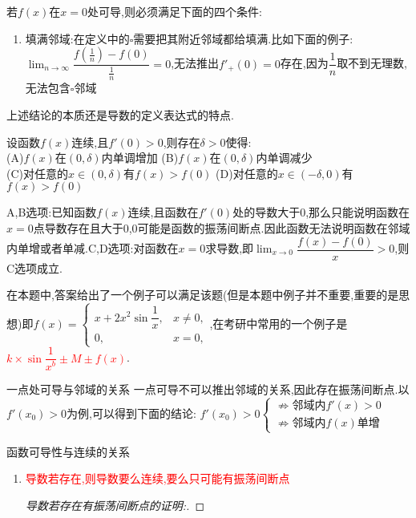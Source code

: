 \documentclass[8pt a4paper, oneside, UTF8]{ctexbook}  %
\begin{document}
\begin{sloppypar}
\begin{conclusion}{若$f(x)$在$x=0$处可导,则必须满足下面的四个条件:}{}
\begin{enumerate}
            \item 填满邻域:在定义中的$\square$需要把其附近邻域都给填满.比如下面的例子:$\lim_{n\to \infty}\dfrac{f(\frac{1}{n})-f(0)}{\frac{1}{n}}=0$,无法推出$f'_+(0)=0$存在,因为$\dfrac{1}{n}$取不到无理数,无法包含$\square$邻域
        \end{enumerate}
        上述结论的本质还是导数的定义表达式的特点.
    \end{conclusion}
    \begin{problem}
    设函数$f(x)$连续,且$f'(0)>0$,则存在$\delta >0 $使得:\\
    (A)$f(x)$在$(0,\delta)$内单调增加 \quad (B)$f(x)$在$(0,\delta)$内单调减少\\
    (C)对任意的$x \in (0,\delta)$有$f(x)>f(0)$ \quad    (D)对任意的$x\in (-\delta,0)$有$f(x)>f(0)$
    \end{problem}
    \begin{solution}
        A,B选项:已知函数$f(x)$连续,且函数在$f'(0)$处的导数大于0,那么只能说明函数在$x=0$点导数存在且大于0,0可能是函数的振荡间断点.因此函数无法说明函数在邻域内单增或者单减.C,D选项:对函数在$x=0$求导数,即$\lim_{x\to 0} \dfrac{f(x)-f(0)}{x}>0$,则C选项成立.
    \end{solution}
    \begin{note}
        在本题中,答案给出了一个例子可以满足该题(但是本题中例子并不重要,重要的是思想)即$f\left(x\right)=\left\{\begin{matrix}x+2x^{2}\sin\dfrac{1}{x},&x\neq0,\\0,&x=0,\end{matrix}\right.$,在考研中常用的一个例子是\textcolor{red}{$k \times \sin \dfrac{1}{x^b}\pm M \pm f(x)$}.
    \end{note}
    \begin{lemma}{一点处可导与邻域的关系}{}
        一点可导不可以推出邻域的关系,因此存在振荡间断点.以$f'(x_0)>0$为例,可以得到下面的结论:
        $f'(x_0)>0\begin{cases}
                \nRightarrow \text{邻域内}f'(x)>0 \\
                \nRightarrow \text{邻域内}f(x)\text{单增}
            \end{cases}$
    \end{lemma}
    \begin{criterion}{函数可导性与连续的关系}{}
        \begin{enumerate}
            \item \textcolor{red}{导数若存在,则导数要么连续,要么只可能有振荡间断点}\label{dslx02}
                  \begin{proof}[导数若存在有振荡间断点的证明:]

\end{proof}
\end{enumerate}
\end{criterion}
\end{sloppypar}
\end{document}

